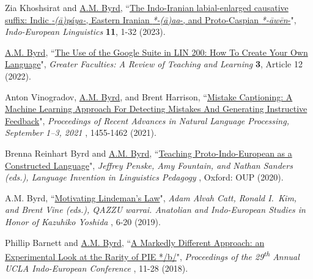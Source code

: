 \documentclass[paper=letter,fontsize=11pt]{scrartcl}
\newcommand{\PaperEntry}[7]{
		\noindent #1, ``\href{#7}{#2}", \textit{#3} \textbf{#4}, #5 (#6).}
\begin{document}
\begin{etaremune}

\item \PaperEntry{Zia Khoshsirat and \underline{A.M. Byrd}}{The Indo-Iranian labial-enlarged causative suffix: Indic \textit{-(ā)páya-}, Eastern Iranian \textit{*-(ā)\textsubarch{u}a\textsubarch{i}a}-, and Proto-Caspian \textit{*-\={a}w\={e}n}-}{Indo-European Linguistics}{11}{1-32}{2023}{https://brill.com/view/journals/ieul/aop/article-10.1163-22125892-bja10025/article-10.1163-22125892-bja10025.xml}

\item \PaperEntry{\underline{A.M. Byrd}}{The Use of the Google Suite in LIN 200: How To Create Your Own Language}{Greater Faculties: A Review of Teaching and Learning}{3}{Article 12}{2022}{https://uknowledge.uky.edu/greaterfaculties/vol3/iss1/12}

\item \PaperEntry{Anton Vinogradov, \underline{A.M. Byrd}, and Brent Harrison}{Mistake Captioning: A Machine Learning Approach For Detecting Mistakes And Generating Instructive Feedback}{Proceedings of Recent Advances in Natural Language Processing, September 1--3, 2021}{\hspace{-.35em}}{1455-1462}{2021}{https://ranlp.org/ranlp2021/proceedings-20Sep.pdf}

\item \PaperEntry{Brenna Reinhart Byrd and \underline{A.M. Byrd}}{Teaching Proto-Indo-European as a Constructed Language}{Jeffrey Penske, Amy Fountain, and Nathan Sanders (eds.), Language Invention in Linguistics Pedagogy}{}{Oxford: OUP}{2020}{https://oxford.universitypressscholarship.com/view/10.1093/oso/9780198829874.001.0001/oso-9780198829874-chapter-12}

\item \PaperEntry{A.M. Byrd}{Motivating Lindeman’s Law}{Adam Alvah Catt, Ronald I.~Kim, and Brent Vine (eds.), QAZZU warrai. Anatolian and Indo-European Studies in Honor of Kazuhiko Yoshida}{\hspace{-.35em}}{6-20}{2019}{http://speakingprimal.com/wp-content/uploads/2019/12/Byrd-Motivating-Lindemans-Law.pdf}

\item \PaperEntry{Phillip Barnett and \underline{A.M. Byrd}}{A Markedly Different Approach: an Experimental Look at the Rarity of PIE */b/}{Proceedings of the 29\textsuperscript{th} Annual UCLA Indo-European Conference}{\hspace{-.35em}}{11-28}{2018}{http://box2018.temp.domains/~speakjb5/wp-content/uploads/2018/03/Barnett-Byrd-A-Markedly-Different-Approach.pdf}


\end{etaremune}
\end{document}
